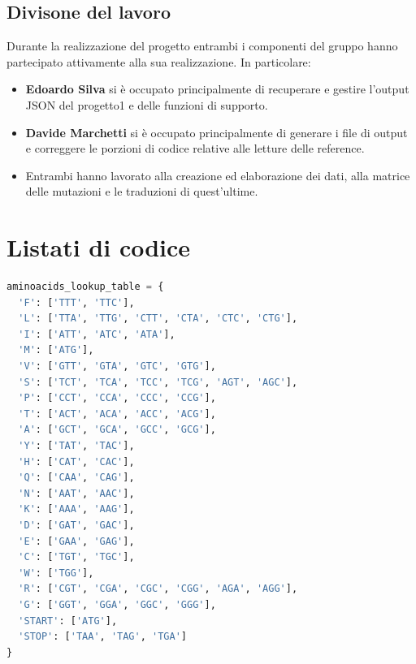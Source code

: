 \documentclass[11pt,italian]{article}
\begin{document}
\subsection{Divisone del lavoro}
Durante la realizzazione del progetto entrambi i componenti del gruppo hanno partecipato attivamente alla sua realizzazione. In particolare:
\begin{itemize}
  \item \textbf{Edoardo Silva} si è occupato principalmente di recuperare e gestire l'output JSON del progetto1 e delle funzioni di supporto.
  \item \textbf{Davide Marchetti} si è occupato principalmente di generare i file di output e correggere le porzioni di codice relative alle letture delle reference.
  \item Entrambi hanno lavorato alla creazione ed elaborazione dei dati, alla matrice delle mutazioni e le traduzioni di quest'ultime.
\end{itemize}

\newpage
\section{Listati di codice}
\begin{lstlisting}[language=Python,caption=Tabella per la traduzione in amminoacidi,label=code:aminoacids_table]
aminoacids_lookup_table = {
  'F': ['TTT', 'TTC'],
  'L': ['TTA', 'TTG', 'CTT', 'CTA', 'CTC', 'CTG'],
  'I': ['ATT', 'ATC', 'ATA'],
  'M': ['ATG'],
  'V': ['GTT', 'GTA', 'GTC', 'GTG'],
  'S': ['TCT', 'TCA', 'TCC', 'TCG', 'AGT', 'AGC'],
  'P': ['CCT', 'CCA', 'CCC', 'CCG'],
  'T': ['ACT', 'ACA', 'ACC', 'ACG'],
  'A': ['GCT', 'GCA', 'GCC', 'GCG'],
  'Y': ['TAT', 'TAC'],
  'H': ['CAT', 'CAC'],
  'Q': ['CAA', 'CAG'],
  'N': ['AAT', 'AAC'],
  'K': ['AAA', 'AAG'],
  'D': ['GAT', 'GAC'],
  'E': ['GAA', 'GAG'],
  'C': ['TGT', 'TGC'],
  'W': ['TGG'],
  'R': ['CGT', 'CGA', 'CGC', 'CGG', 'AGA', 'AGG'],
  'G': ['GGT', 'GGA', 'GGC', 'GGG'],
  'START': ['ATG'],
  'STOP': ['TAA', 'TAG', 'TGA']
}
\end{lstlisting}
\end{document}
